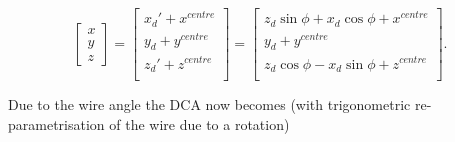 \documentclass[a4paper,11pt]{article}
\begin{document}
\begin{equation}
\begin{bmatrix}x\\y\\z\end{bmatrix}=\begin{bmatrix}x_d'+x^{centre}\\ y_d + y^{centre} \\z_d'+z^{centre}\\\end{bmatrix}=\begin{bmatrix}z_d\sin \phi +x_d\cos \phi + x^{centre} \\ y_d + y^{centre} \\ z_d\cos \phi -x_d\sin \phi + z^{centre} \\\end{bmatrix}. \label{eq:global}
\end{equation}

Due to the wire angle the DCA now becomes (with trigonometric re-parametrisation of the wire due to a rotation)
\end{document}
